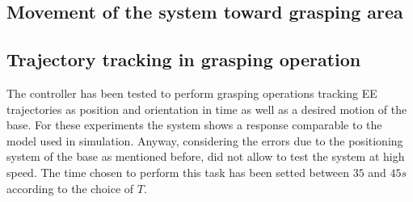 	


	\subsection{Movement of the system toward grasping area}


\subsection{Trajectory tracking in grasping operation}

The controller has been tested to perform grasping operations tracking EE trajectories as position and orientation in time as well as a desired motion of the base. For these experiments the system shows a response comparable to the model used in simulation. Anyway, considering the errors due to the positioning system of the base as mentioned before, did not allow to test the system at high speed. The time chosen to perform this task has been setted between $35$ and $45 s$ according to the choice of $T$. 


